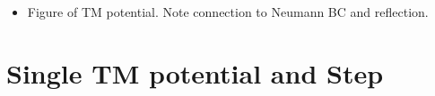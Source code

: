 \begin{itemize}
  \item Figure of TM potential.  Note connection to Neumann BC and reflection.  
\end{itemize}

\section{Single TM potential and Step}

